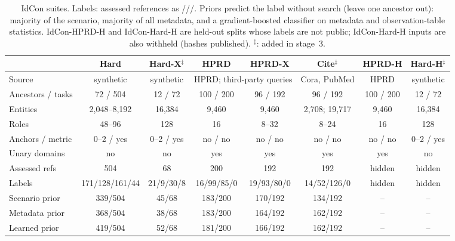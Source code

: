 \begin{table}[t]
\caption{IdCon suites. Labels: assessed references as \Sat/\Vio/\Unk/\Emp. Priors predict the label without search (leave one ancestor out): majority of the scenario, majority of all metadata, and a gradient-boosted classifier on metadata and observation-table statistics. IdCon-HPRD-H and IdCon-Hard-H are held-out splits whose labels are not public; IdCon-Hard-H inputs are also withheld (hashes published). $^\ddagger$: added in stage~3.}
\label{tab:suites}
\centering\footnotesize
\setlength{\tabcolsep}{3.5pt}
\begin{tabular}{lccccccc}
\toprule
 & Hard & Hard-X$^\ddagger$ & HPRD & HPRD-X & Cite$^\ddagger$ & HPRD-H & Hard-H$^\ddagger$\\
\midrule
Source & synthetic & synthetic & \multicolumn{2}{c}{HPRD; third-party queries} & Cora, PubMed & HPRD & synthetic\\
Ancestors / tasks & 72 / 504 & 12 / 72 & 100 / 200 & 96 / 192 & 96 / 192 & 100 / 200 & 12 / 72\\
Entities & 2,048--8,192 & 16,384 & 9,460 & 9,460 & 2,708; 19,717 & 9,460 & 16,384\\
Roles & 48--96 & 128 & 16 & 8--32 & 8--24 & 16 & 128\\
Anchors / metric & 0--2 / yes & 0--2 / yes & no / no & no / no & no / no & no / no & 0--2 / yes\\
Unary domains & no & no & yes & yes & yes & yes & no\\
Assessed refs & 504 & 68 & 200 & 192 & 192 & hidden & hidden\\
Labels & 171/128/161/44 & 21/9/30/8 & 16/99/85/0 & 19/93/80/0 & 14/52/126/0 & hidden & hidden\\
Scenario prior & 339/504 & 45/68 & 183/200 & 170/192 & 134/192 & -- & --\\
Metadata prior & 368/504 & 38/68 & 183/200 & 164/192 & 162/192 & -- & --\\
Learned prior & 419/504 & 52/68 & 181/200 & 166/192 & 162/192 & -- & --\\
\bottomrule
\end{tabular}
\end{table}
